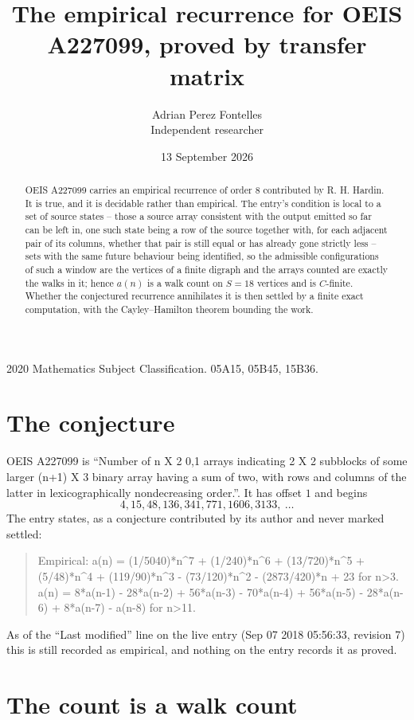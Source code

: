 \documentclass[11pt,a4paper]{article}
\title{The empirical recurrence for OEIS A227099, proved by transfer matrix}
\author{Adrian Perez Fontelles\\ \small Independent researcher}
\date{13 September 2026}
\theoremstyle{plain}
\theoremstyle{definition}
\begin{document}
\maketitle

\begin{abstract}
OEIS A227099 carries an empirical recurrence of order $8$ contributed by R. H. Hardin. It is
true, and it is decidable rather than empirical. The entry's condition is local to a set of source states -- those a source array consistent with the output emitted so far can be left in, one such state being a row of the source together with, for each adjacent pair of its columns, whether that pair is still equal or has already gone strictly less -- sets with the same future behaviour being identified, so
the admissible configurations of such a window are the vertices of a finite digraph and the
arrays counted are exactly the walks in it; hence $a(n)$ is a walk count on $S=18$ vertices
and is $C$-finite. Whether the conjectured recurrence annihilates it is then settled by a
finite exact computation, with the Cayley--Hamilton theorem bounding the work.
\end{abstract}

\noindent\small 2020 Mathematics Subject Classification. 05A15, 05B45, 15B36.\normalsize

\section{The conjecture}

OEIS A227099 is ``Number of n X 2 0,1 arrays indicating 2 X 2 subblocks of some larger (n+1) X 3 binary array having a sum of two, with rows and columns of the latter in lexicographically nondecreasing order.''. It has offset $1$ and begins
\[
4, 15, 48, 136, 341, 771, 1606, 3133,\ \dots
\]
The entry states, as a conjecture contributed by its author and never marked settled:
\begin{quote}
Empirical: a(n) = (1/5040)*n\^{}7 + (1/240)*n\^{}6 + (13/720)*n\^{}5 + (5/48)*n\^{}4 + (119/90)*n\^{}3 - (73/120)*n\^{}2 - (2873/420)*n + 23 for n>3. a(n) = 8*a(n-1) - 28*a(n-2) + 56*a(n-3) - 70*a(n-4) + 56*a(n-5) - 28*a(n-6) + 8*a(n-7) - a(n-8) for n>11.
\end{quote}
As of the ``Last modified'' line on the live entry (Sep 07 2018 05:56:33, revision 7) this is still
recorded as empirical, and nothing on the entry records it as proved.

\section{The count is a walk count}
\end{document}
